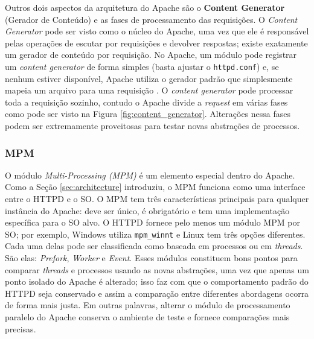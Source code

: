Outros dois aspectos da arquitetura do Apache são o \textbf{Content Generator}
(Gerador de Conteúdo) e as fases de processamento das requisições. O
\emph{Content Generator} pode ser visto como o núcleo do Apache, uma vez que
ele é responsável pelas operações de escutar por requisições e devolver
respostas; existe exatamente um gerador de conteúdo por requisição. No Apache,
um módulo pode registrar um \emph{content generator} de forma simples (basta
ajustar o \texttt{httpd.conf}) e, se nenhum estiver disponível, Apache utiliza
o gerador padrão que simplesmente mapeia um arquivo para uma requisição
\citep{apache_module_book}. O \emph{content generator} pode processar toda a
requisição sozinho, contudo o Apache divide a \emph{request} em várias fases
como pode ser visto na Figura \ref{fig:content_generator}. Alterações nessa
fases podem ser extremamente proveitosas para testar novas abstrações de
processos.

\subsubsection{MPM}
\label{sec:prefork}

O módulo \emph{Multi-Processing (MPM)} é um elemento especial dentro do Apache.
Como a Seção \ref{sec:architecture} introduziu, o MPM funciona como uma
interface entre o HTTPD e o SO. O MPM tem três características principais para
qualquer instância do Apache: deve ser único, é obrigatório e tem uma
implementação específica para o SO alvo. O HTTPD fornece pelo menos um módulo
MPM por SO; por exemplo, Windows utiliza \texttt{mpm\_winnt} e Linux tem três
opções diferentes. Cada uma delas pode ser classificada como baseada em
processos ou em \emph{threads}. São elas: \emph{Prefork}, \emph{Worker} e
\emph{Event}. Esses módulos constituem bons pontos para comparar \emph{threads}
e processos usando as novas abstrações, uma vez que apenas um ponto isolado do
Apache é alterado; isso faz com que o comportamento padrão do HTTPD seja
conservado e assim a comparação entre diferentes abordagens ocorra de forma
mais justa. Em outras palavras, alterar o módulo de processamento paralelo do
Apache conserva o ambiente de teste e fornece comparações mais precisas.

